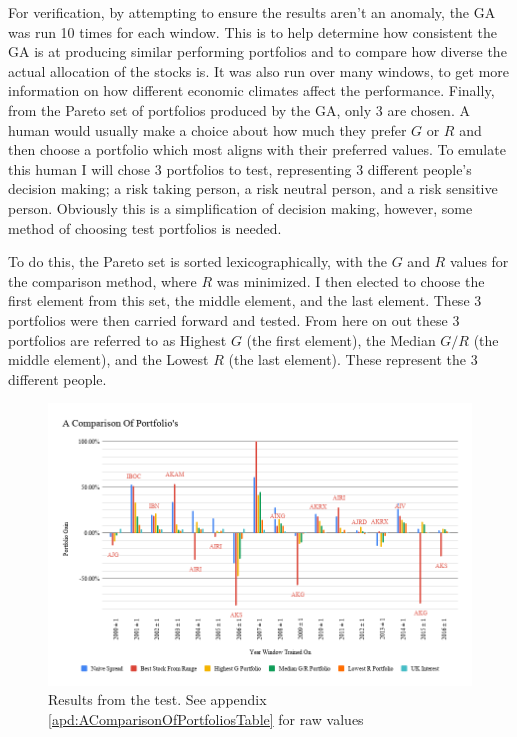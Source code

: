 \documentclass[11pt]{article}
\begin{document}
    For verification, by attempting to ensure the results aren't an anomaly, the GA was run 10
    times for each window. This is to help determine how consistent the GA is at producing
    similar performing portfolios and to compare how diverse the actual allocation
    of the stocks is. It was also run over many windows, to get more information
    on how different economic climates affect the performance. Finally, from the Pareto
    set of portfolios produced by the GA, only 3 are chosen. A human would usually make a choice about how much
    they prefer \(G\) or \(R\) and then choose a portfolio which most
    aligns with their preferred values. To emulate this human I will chose 3
    portfolios to test, representing 3 different people's decision making; a risk
    taking person, a risk neutral person, and a risk sensitive person. Obviously
    this is a simplification of decision making, however, some method of choosing
    test portfolios is needed.

    To do this, the Pareto set is sorted lexicographically, with the \(G\) and \(R\)
    values for the comparison method, where \(R\) was minimized. I then elected to choose
    the first element from this set, the middle element, and the last element.
    These 3 portfolios were then carried forward and tested. From here on out
    these 3 portfolios are referred to as Highest \(G\) (the first element),
    the Median \(G/R\) (the middle element), and the Lowest \(R\) (the last element).
    These represent the 3 different people.

    \begin{figure}[H] %
        \includegraphics[width=\textwidth]{AComparisonOfPortfolios}
        \caption{Results from the test. See appendix \ref{apd:AComparisonOfPortfoliosTable} for raw values}
            \label{fig:AComparisonOfPortfolios}
    \end{figure}
\end{document}
